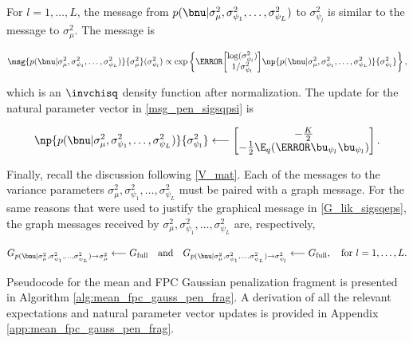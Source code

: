 \documentclass[12pt]{article}
\def\sigsqmu{\sigma^2_{\mu}}
\newcommand\upsi[1]{\bu_{\psi_{#1}}}
\newcommand\sigsqpsi[1]{\sigma^2_{\psi_{#1}}}
\theoremstyle{plain}
\theoremstyle{definition}
\theoremstyle{remark}
\begin{document}
For $l = 1, \dots, L$, the message from $p (\bnu | \sigsqmu, \sigsqpsi{1}, \dots, \sigsqpsi{L})$ to $\sigsqpsi{l}$
is similar to the message to $\sigsqmu$. The message is

\begin{equation}
	\msg{p (\bnu | \sigsqmu, \sigsqpsi{1}, \dots, \sigsqpsi{L})}{\sigsqmu} (\sigsqpsi{l})
		\propto
			\exp \left\{
				\T{\begin{bmatrix}
					\log (\sigsqpsi{l}) \\
					1/\sigsqpsi{l}
				\end{bmatrix}} 
				\np{p (\bnu | \sigsqmu, \sigsqpsi{1}, \dots, \sigsqpsi{L})}{\sigsqpsi{l}}
			\right\},
\label{msg_pen_sigsqpsi}
\end{equation}

\noindent which is an $\invchisq$ density function after normalization. The update for the natural parameter vector
in \eqref{msg_pen_sigsqpsi} is

\begin{equation}
	\np{p (\bnu | \sigsqmu, \sigsqpsi{1}, \dots, \sigsqpsi{L})}{\sigsqpsi{l}}
		\longleftarrow
			\begin{bmatrix}
				-\frac{K}{2} \\
				-\frac12 \E_q (\T{\upsi{l}} \upsi{l})
			\end{bmatrix}.
\label{np_pen_sigsqpsi}
\end{equation}

Finally, recall the discussion following \eqref{V_mat}. Each of the messages to the variance parameters $\sigsqmu,
\sigsqpsi{1}, \dots, \sigsqpsi{L}$ must be paired with a graph message. For the same reasons that were used to
justify the graphical message in \eqref{G_lik_sigsqeps}, the graph messages received by $\sigsqmu,
\sigsqpsi{1}, \dots, \sigsqpsi{L}$ are, respectively,

\begin{equation}
	G_{p (\bnu | \sigsqmu, \sigsqpsi{1}, \dots, \sigsqpsi{L}) \rightarrow \sigsqmu}
		\longleftarrow
			G_{\text{full}} \quad
	\text{and} \quad
	G_{p (\bnu | \sigsqmu, \sigsqpsi{1}, \dots, \sigsqpsi{L}) \rightarrow \sigsqpsi{l}}
		\longleftarrow
			G_{\text{full}}, \quad \text{for $l = 1, \dots, L$.}
\label{G_pen}
\end{equation}

Pseudocode for the mean and FPC Gaussian penalization fragment is presented in Algorithm
\ref{alg:mean_fpc_gauss_pen_frag}.
A derivation of all the relevant expectations and natural parameter vector updates is provided in Appendix
\ref{app:mean_fpc_gauss_pen_frag}.
\end{document}
